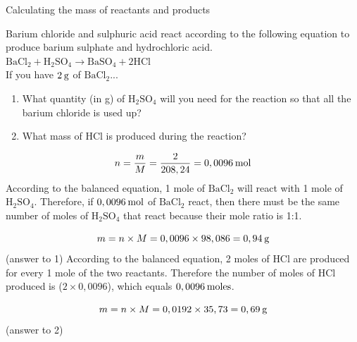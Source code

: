 \label{m38717*secfhsst!!!underscore!!!id695}
      \begin{wex}{ Calculating the mass of reactants and products }
{
      \label{m38717*id279063}Barium chloride and sulphuric acid react according to the following equation to produce barium sulphate and hydrochloric acid.\\
      \label{m38717*id279070}
        ${\text{BaCl}}_{2}+{\text{H}}_{2}{\text{SO}}_{4}\to {\text{BaSO}}_{4}+2\text{HCl}$
      \\
      \label{m38717*id279141}If you have $2\phantom{\rule{2pt}{0ex}}\text{g}$ of $\text{BaCl}{}_{2}$... 
      \label{m38717*id279158}\begin{enumerate}[noitemsep, label=\textbf{\arabic*}. ] 
            \label{m38717*uid37}\item What quantity (in g) of $\text{H}{}_{2}\text{SO}{}_{4}$ will you need for the reaction so that all the barium chloride is used up?
\label{m38717*uid38}\item What mass of $\text{HCl}$ is produced during the reaction?
\end{enumerate}
     
}
{
        
    \begin{equation*}
    n=\frac{m}{M}=\frac{2}{208,24}=0,0096\phantom{\rule{2pt}{0ex}}\text{mol}
      \end{equation*}
      \label{m38717*id279344}According to the balanced equation, 1 mole of $\text{BaCl}{}_{2}$ will react with 1 mole of $\text{H}{}_{2}\text{SO}{}_{4}$. Therefore, if $0,0096\phantom{\rule{2pt}{0ex}}\text{mol}$ of $\text{BaCl}{}_{2}$ react, then there must be the same number of moles of $\text{H}{}_{2}\text{SO}{}_{4}$ that react because their mole ratio is 1:1.
      \label{m38717*id279456}\nopagebreak\noindent{}
        
    \begin{equation*}
    m=n\ensuremath{\times}M=0,0096\ensuremath{\times}98,086=0,94\phantom{\rule{2pt}{0ex}}\text{g}
      \end{equation*}
      \label{m38717*id279505}(answer to 1) 
      \label{m38717*id279513}According to the balanced equation, 2 moles of $\text{HCl}$ are produced for every 1 mole of the two reactants. Therefore the number of moles of $\text{HCl}$ produced is ($2\ensuremath{\times}0,0096$), which equals $0,0096\phantom{\rule{2pt}{0ex}}\text{moles}$.
      \label{m38717*id279531}\nopagebreak\noindent{}
        
    \begin{equation*}
    m=n\ensuremath{\times}M=0,0192\ensuremath{\times}35,73=0,69\phantom{\rule{2pt}{0ex}}\text{g}
      \end{equation*}
      \label{m38717*id279580}(answer to 2) 
}
    \end{wex}
    \noindent
  
